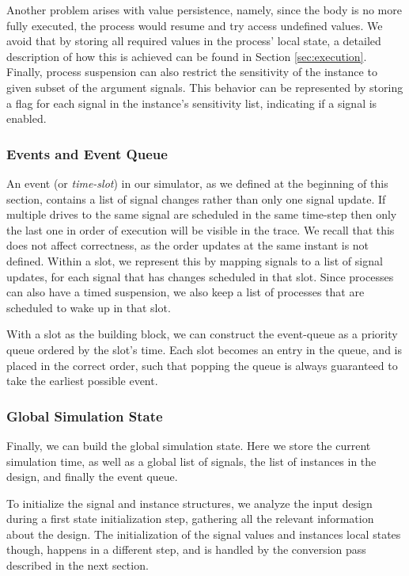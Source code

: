 Another problem arises with value persistence, namely, since the body is no more fully executed, the process would resume and try access undefined values. We avoid that by storing all required values in the process' local state, a detailed description of how this is achieved can be found in Section \ref{sec:execution}. Finally, process suspension can also restrict the sensitivity of the instance to given subset of the argument signals. This behavior can be represented by storing a flag for each signal in the instance's sensitivity list, indicating if a signal is enabled.


\subsubsection{Events and Event Queue}
An event (or \textit{time-slot}) in our simulator, as we defined at the beginning of this section, contains a list of signal changes rather than only one signal update. If multiple drives to the same signal are scheduled in the same time-step then only the last one in order of execution will be visible in the trace. We recall that this does not affect correctness, as the order updates at the same instant is not defined. Within a slot, we represent this by mapping signals to a list of signal updates, for each signal that has changes scheduled in that slot. Since processes can also have a timed suspension, we also keep a list of processes that are scheduled to wake up in that slot.

With a slot as the building block, we can construct the event-queue as a priority queue ordered by the slot's time. Each slot becomes an entry in the queue, and is placed in the correct order, such that popping the queue is always guaranteed to take the earliest possible event.


\subsubsection{Global Simulation State}
Finally, we can build the global simulation state. Here we store the current simulation time, as well as a global list of signals, the list of instances in the design, and finally the event queue.

To initialize the signal and instance structures, we analyze the input design during a first state initialization step, gathering all the relevant information about the design. The initialization of the signal values and instances local states though, happens in a different step, and is handled by the conversion pass described in the next section.

